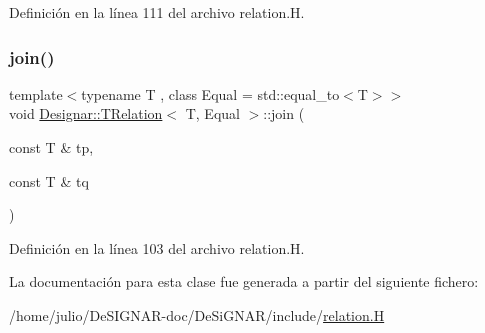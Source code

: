 Definición en la línea 111 del archivo relation.\+H.

\mbox{\label{class_designar_1_1_t_relation_a484b21a54f5d2b9862487fbb8b5ac1e7}} 
\subsubsection{\texorpdfstring{join()}{join()}}
{\footnotesize\ttfamily template$<$typename T , class Equal  = std\+::equal\+\_\+to$<$\+T$>$$>$ \\
void \hyperlink{class_designar_1_1_t_relation}{Designar\+::\+T\+Relation}$<$ T, Equal $>$\+::join (\begin{DoxyParamCaption}\item[{const T \&}]{tp,  }\item[{const T \&}]{tq }\end{DoxyParamCaption})\hspace{0.3cm}{\ttfamily [inline]}}



Definición en la línea 103 del archivo relation.\+H.



La documentación para esta clase fue generada a partir del siguiente fichero\+:\begin{DoxyCompactItemize}
\item 
/home/julio/\+De\+S\+I\+G\+N\+A\+R-\/doc/\+De\+Si\+G\+N\+A\+R/include/\hyperlink{relation_8_h}{relation.\+H}\end{DoxyCompactItemize}
